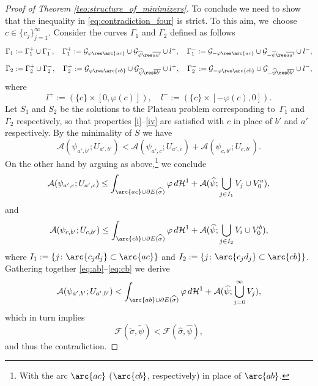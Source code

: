\begin{proof}[Proof of Theorem \ref{teo:structure_of_minimizers}]
To conclude we need to show that the inequality in \eqref{eq:contradiction_four} is strict. To this aim, we~choose $c\in\{c_j\}_{j=1}^\infty$.
Consider the curves $\Gamma_1$ and $\Gamma_2$ defined as follows
\begin{equation*}
\Gamma_1:=\Gamma_1^+\cup\Gamma_1^-,\quad \Gamma_1^+:=\mathcal{G}_{\varphi\res\arc{ac}}
\cup\mathcal{G}_{\widehat\psi\res\overline{aa'}}\cup l^+
,\quad
\Gamma_1^-:=\mathcal{G}_{-\varphi\res\arc{ac}}
\cup\mathcal{G}_{-\widehat\psi\res\overline{aa'}}\cup l^-,
\end{equation*}
\begin{equation*}
\Gamma_2:=\Gamma_2^+\cup\Gamma_2^-,\quad \Gamma_2^+:=\mathcal{G}_{\varphi\res\arc{cb}}
\cup\mathcal{G}_{\widehat\psi\res\overline{bb'}}\cup l^+
,\quad
\Gamma_2^-:=\mathcal{G}_{-\varphi\res\arc{cb}}
\cup\mathcal{G}_{-\widehat\psi\res\overline{bb'}}\cup l^-,
\end{equation*}
where\vspace*{-3pt}
\begin{equation*}
l^+:=(\{c\}\times[0,\varphi(c)]),\quad
l^-:=(\{c\}\times[-\varphi(c),0]).
\end{equation*}
Let $S_1$ and $S_2$ be the solutions to the Plateau problem corresponding to~$\Gamma_1$ and~$\Gamma_2$ respectively, so that properties \ref{i}--\ref{iv} are satisfied with $c$ in place of $b'$ and $a'$ respectively.
By the minimality of $S$ we have
\begin{equation}\label{eq:ab}
\mathcal{A}(\psi_{a',b'};U_{a',b'})<\mathcal{A}(\psi_{a',c};U_{a',c})+\mathcal{A}(\psi_{c,b'};U_{c,b'}).
\end{equation}\label{eq:ac}
On the other hand by arguing as above,\footnote{With the arc $\arc{ac}$ ($\arc{cb}$, respectively) in place of $\arc{ab}$.} we conclude
\begin{equation}
\mathcal{A}(\psi_{a',c};U_{a',c})\le\int_{\arc{ac}\cup\partial E(\widehat\sigma)}\varphi\,d\mathcal{H}^1+\mathcal{A}(\widehat\psi;\bigcup_{j\in I_1} V_j\cup V^a_0),
\end{equation}
and\vspace*{-3pt}
\begin{equation}\label{eq:cb}
\mathcal{A}(\psi_{c,b'};U_{c,b'})\le\int_{\arc{cb}\cup\partial E(\widehat\sigma)}\varphi\,d\mathcal{H}^1+\mathcal{A}(\widehat\psi;\bigcup_{j\in I_2} V_i\cup V^b_0),
\end{equation}
where $I_1:=\{j\colon \arc{c_jd_j}\subset\arc{ac}\}$ and $I_2:=\{j\colon \arc{c_jd_j}\subset\arc{cb}\}$. Gathering together \eqref{eq:ab}--\eqref{eq:cb} we derive\vspace*{-3pt}
\begin{equation*}
\mathcal{A}(\psi_{a',b'};U_{a',b'})<
\int_{\arc{ab}\cup\partial E(\widehat\sigma)}\varphi\,d\mathcal{H}^1+\mathcal{A}(\widehat\psi;\bigcup_{j=0}^\infty V_j),
\end{equation*}
which in turn implies\vspace*{-3pt}
\begin{equation*}
{\mathcal F}(\widetilde\sigma,\widetilde\psi)<
{\mathcal F}(\widehat\sigma,\widehat\psi),
\end{equation*}
and thus the contradiction.


\end{proof}
